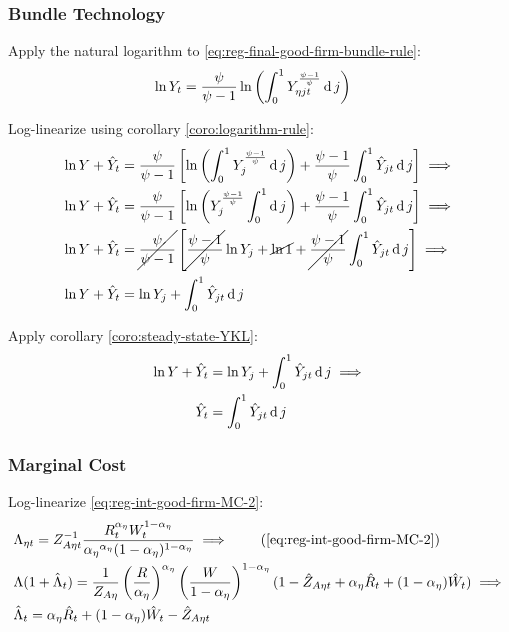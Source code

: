 \documentclass[
	thesis.tex
	]{subfiles}
\begin{document}
\subsubsection{Bundle Technology}

Apply the natural logarithm to \ref{eq:reg-final-good-firm-bundle-rule}:
\begin{align}
	\ln Y_t &= \frac{\psi}{\psi-1} \ln \left( \int_{0}^{1} Y_{\eta jt}^{\frac{\psi-1}{\psi}} \operatorname{d} j \right) \nonumber
\end{align}

Log-linearize using corollary \ref{coro:logarithm-rule}:
\begin{align}
	\ln Y + \hat{Y}_t &= \frac{\psi}{\psi-1} \left[ \ln \left( \int_{0}^{1} Y_{j}^{\frac{\psi-1}{\psi}} \operatorname{d} j \right) + \frac{\psi-1}{\psi} \int_{0}^{1} \hat{Y}_{jt} \operatorname{d} j \right] \implies \nonumber
	\\
	\ln Y + \hat{Y}_t &= \frac{\psi}{\psi-1} \left[ \ln \left( Y_{j}^{\frac{\psi-1}{\psi}} \int_{0}^{1} \operatorname{d} j \right) + \frac{\psi-1}{\psi} \int_{0}^{1} \hat{Y}_{jt} \operatorname{d} j \right] \implies \nonumber
	\\
	\ln Y + \hat{Y}_t &= \cancel{\frac{\psi}{\psi-1}} \left[ \cancel{\frac{\psi-1}{\psi}} \ln Y_{j} + \cancel{\ln1} + \cancel{\frac{\psi-1}{\psi}} \int_{0}^{1} \hat{Y}_{jt} \operatorname{d} j \right] \implies \nonumber
	\\
	\ln Y + \hat{Y}_t &= \ln Y_{j} + \int_{0}^{1} \hat{Y}_{jt} \operatorname{d} j \nonumber
\end{align}

Apply corollary \ref{coro:steady-state-YKL}:
\begin{align}
	\ln Y + \hat{Y}_t &= \ln Y_{j} + \int_{0}^{1} \hat{Y}_{jt} \operatorname{d} j \implies \nonumber \\
	\hat{Y}_t &= \int_{0}^{1} \hat{Y}_{jt} \operatorname{d} j 
	\label{eq:reg-ll-final-good-firm-bundle-rule}
\end{align}


\subsubsection{Marginal Cost}

Log-linearize \ref{eq:reg-int-good-firm-MC-2}:
\begin{alignat}{2}
	& \Lambda_{\eta t} = Z_{A\eta t}^{-1} \frac{R_t^{{\alpha_\eta}} W_t^{1-{\alpha_\eta}} }{ {\alpha_\eta}^{{\alpha_\eta}} (1-{\alpha_\eta})^{1-{\alpha_\eta}} } \implies \tag{\ref{eq:reg-int-good-firm-MC-2}} \\
	& \Lambda (1+ \hat{\Lambda}_t) = \frac{1}{Z_{A\eta}} \left( \frac{R}{{\alpha_\eta}} \right)^{{\alpha_\eta}} \left( \frac{W}{1-{\alpha_\eta}} \right)^{1-{\alpha_\eta}} (1- \hat{Z}_{A\eta t} + {\alpha_\eta} \hat{R}_t + (1- {\alpha_\eta}) \hat{W}_t ) \implies \nonumber \\
	& \hat{\Lambda}_t = {\alpha_\eta} \hat{R}_t + (1- {\alpha_\eta}) \hat{W}_t - \hat{Z}_{A\eta t} \label{eq:reg-ll-int-good-firm-MC-2}
\end{alignat}
\end{document}
